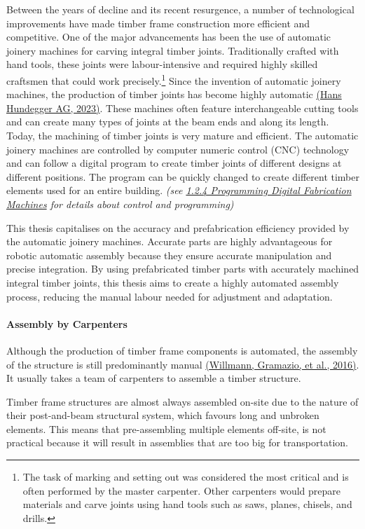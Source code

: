 \documentclass[11pt]{book}
\begin{document}
Between the years of decline and its recent resurgence, a number of technological improvements have made timber frame construction more efficient and competitive. One of the major advancements has been the use of automatic joinery machines for carving integral timber joints. Traditionally crafted with hand tools, these joints were labour-intensive and required highly skilled craftsmen that could work precisely.\footnote{ The task of marking and setting out was considered the most critical and is often performed by the master carpenter. Other carpenters would prepare materials and carve joints using hand tools such as saws, planes, chisels, and drills.}\textit{ }Since the invention of automatic joinery machines, the production of timber joints has become highly automatic \href{https://www.zotero.org/google-docs/?1lvKCf}{(Hans Hundegger AG, 2023)}. These machines often feature interchangeable cutting tools and can create many types of joints at the beam ends and along its length. Today, the machining of timber joints is very mature and efficient. The automatic joinery machines are controlled by computer numeric control (CNC) technology and can follow a digital program to create timber joints of different designs at different positions. The program can be quickly changed to create different timber elements used for an entire building. \textit{(see \uline{1.2.4 Programming Digital Fabrication Machines} for details about control and programming)}

This thesis capitalises on the accuracy and prefabrication efficiency provided by the automatic joinery machines. Accurate parts are highly advantageous for robotic automatic assembly because they ensure accurate manipulation and precise integration. By using prefabricated timber parts with accurately machined integral timber joints, this thesis aims to create a highly automated assembly process, reducing the manual labour needed for adjustment and adaptation. 

\paragraph{Assembly by Carpenters}

Although the production of timber frame components is automated, the assembly of the structure is still predominantly manual \href{https://www.zotero.org/google-docs/?mMONEv}{(Willmann, Gramazio, et al., 2016)}. It usually takes a team of carpenters to assemble a timber structure.

Timber frame structures are almost always assembled on-site due to the nature of their post-and-beam structural system, which favours long and unbroken elements. This means that pre-assembling multiple elements off-site, is not practical because it will result in assemblies that are too big for transportation. 
\end{document}
